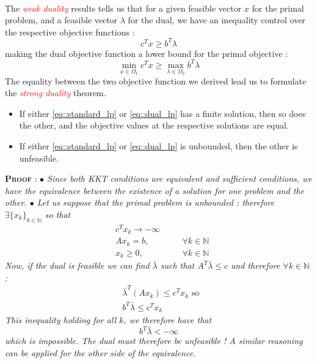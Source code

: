 \documentclass[a4paper]{article}
\begin{document}
{{{				\paragraph{} The \emph{\textcolor{red}{weak duality}} results tells us that for a given feasible vector $x$ for the primal problem, and a feasible vector $\lambda$ for the dual, we have an inequality control over the respective objective functions : 
				\begin{equation}
					c^T x \geq b^T \lambda 
				\end{equation}
				making the dual objective function a lower bound for the primal objective : 
				\begin{equation}
					\min_{x\in\Omega_1} c^Tx \geq \max_{\lambda\in\Omega_2} b^T\lambda 
				\end{equation}
				The equality between the two objective function we derived lead us to formulate the \emph{\textcolor{red}{strong duality}} theorem.
				\vspace{10pt}
				
				{
					\begin{itemize}
						\item If either \eqref{eq::standard_lp} or \eqref{eq::dual_lp} has a finite solution, then so does the other, and the objective values at the respective solutions are equal. 
						\item If either \eqref{eq::standard_lp} or \eqref{eq::dual_lp} is unbounded, then the other is unfeasible. 
					\end{itemize}
				}
				\vspace{10pt}
				\begin{leftbar}
					\noindent\textbf{\textsc{Proof}} :\newline
					\emph{$\bullet$ Since both KKT conditions are equivalent and sufficient conditions, we have the equivalence between the existence of a solution for one problem and the other.
					\newline 
					$\bullet$ Let us suppose that the primal problem is unbounded : therefore $\exists\{x_k\}_{k\in\mathbb{N}}$ so that 
					$$
						\begin{aligned}
							&c^Tx_k \to -\infty && \\
							&Ax_k = b, &&\quad \forall k\in\mathbb{N} \\
							& x_k \geq 0, &&\quad \forall k\in\mathbb{N}
						\end{aligned}	
					$$
					Now, if the dual is feasible we can find $\bar{\lambda}$ such that $A^T\bar{\lambda} \leq c$ and therefore $\forall k \in\mathbb{N}$ : 
					$$
						\begin{aligned}
							&\bar{\lambda}^T(Ax_k) \leq c^Tx_k  \text{ so } \\
							&b^T\bar{\lambda} \leq c^Tx_k
						\end{aligned}
					$$
					This inequality holding for all $k$, we therefore have that 
					$$
						b^T \bar{\lambda} < -\infty
					$$
					which is impossible. The dual must therefore be unfeasible ! A similar reasoning can be applied for the other side of the equivalence. 
					}
				\end{leftbar}
				
}}}
\end{document}
